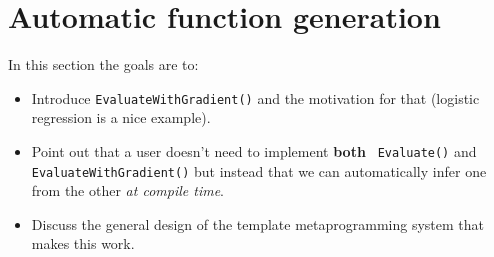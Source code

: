 \section{Automatic function generation}
\label{sec:automatic}

In this section the goals are to:

\begin{itemize}
  \item Introduce {\tt EvaluateWithGradient()} and the motivation for that
(logistic regression is a nice example).

  \item Point out that a user doesn't need to implement {\bf both} {\tt
Evaluate()} and {\tt EvaluateWithGradient()} but instead that we can
automatically infer one from the other {\it at compile time}.

  \item Discuss the general design of the template metaprogramming system that
makes this work.
\end{itemize}
